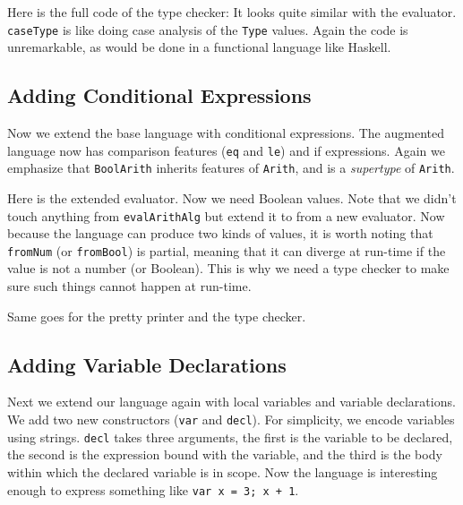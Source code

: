 Here is the full code of the type checker:
It looks quite similar with the evaluator. \lstinline{caseType} is like doing
case analysis of the \lstinline{Type} values. Again the code is unremarkable, as
would be done in a functional language like Haskell.


\subsection{Adding Conditional Expressions}

Now we extend the base language with conditional expressions.
The augmented language now has comparison features (\lstinline{eq} and
\lstinline{le}) and if expressions. Again we emphasize that
\lstinline{BoolArith} inherits features of \lstinline{Arith}, and is a
\textit{supertype} of \lstinline{Arith}.

Here is the extended evaluator. Now we need Boolean values.
Note that we didn't touch anything from \lstinline{evalArithAlg} but extend it
to from a new evaluator. Now because the language can produce two kinds of
values, it is worth noting that \lstinline{fromNum} (or \lstinline{fromBool}) is
partial, meaning that it can diverge at run-time if the value is not a number
(or Boolean). This is why we need a type checker to make sure such things cannot
happen at run-time.

Same goes for the pretty printer and the type checker.



\subsection{Adding Variable Declarations}

Next we extend our language again with local variables and variable
declarations. We add two new constructors (\lstinline{var} and
\lstinline{decl}).
For simplicity, we encode variables using strings. \lstinline{decl} takes three
arguments, the first is the variable to be declared, the second is the
expression bound with the variable, and the third is the body within which the
declared variable is in scope. Now the language is interesting enough to express
something like \lstinline{var x = 3; x + 1}.


